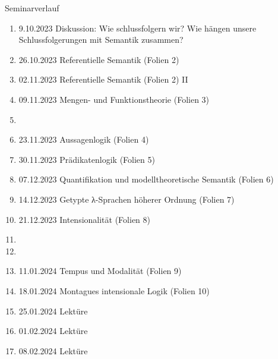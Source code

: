 \begin{frame}
  {Seminarverlauf}
  \onslide<+->
  \begin{enumerate}[<+->]\Lf\scriptsize
    \item \alert{9.10.2023} Diskussion: Wie schlussfolgern wir? Wie hängen unsere Schlussfolgerungen mit Semantik zusammen?
    \item \alert{26.10.2023} Referentielle Semantik (Folien 2)
    \item \alert{02.11.2023} Referentielle Semantik (Folien 2) II
    \item \alert{09.11.2023} Mengen- und Funktionstheorie (Folien 3)
    \item[\rule{1.2em}{1.2em}] 
    \item \alert{23.11.2023} Aussagenlogik (Folien 4)
    \item \alert{30.11.2023} Prädikatenlogik (Folien 5)
    \item \alert{07.12.2023} Quantifikation und modelltheoretische Semantik (Folien 6)
    \item \alert{14.12.2023} Getypte λ-Sprachen höherer Ordnung (Folien 7)
    \item \alert{21.12.2023} Intensionalität (Folien 8)
    \item[\rule{1.2em}{1.2em}] 
    \item[\rule{1.2em}{1.2em}] 
    \item \alert{11.01.2024} Tempus und Modalität (Folien 9)
    \item \alert{18.01.2024} Montagues intensionale Logik (Folien 10)
    \item \alert{25.01.2024} Lektüre 
    \item \alert{01.02.2024} Lektüre
    \item \alert{08.02.2024} Lektüre
  \end{enumerate}
\end{frame}

